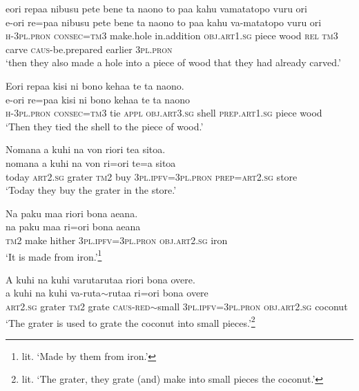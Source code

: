 \ea\label{ex:text01-78}
eori repaa nibusu pete bene ta naono to paa kahu vamatatopo vuru ori\\
\gll e-ori	re=paa	nibusu	pete	bene	ta	naono	to	paa	kahu	va-matatopo	vuru	ori\\
     \textsc{h}-3\textsc{pl}.\textsc{pron}	\textsc{consec}=\textsc{tm}3	make.hole	in.addition	\textsc{obj}.\textsc{art}1.\textsc{sg}	piece	wood	\textsc{rel}	\textsc{tm}3	carve	\textsc{caus}-be.prepared	earlier	3\textsc{pl}.\textsc{pron}\\
\glt `then they also made a hole into a piece of wood that they had already carved.'
\z

\ea\label{ex:text01-79}
Eori repaa kisi ni bono kehaa te ta naono.\\
\gll e-ori	re=paa	kisi	ni	bono	kehaa	te	ta	naono\\
     \textsc{h}-3\textsc{pl}.\textsc{pron}	\textsc{consec}=\textsc{tm}3	tie	\textsc{appl}	\textsc{obj}.\textsc{art}3.\textsc{sg}	shell	\textsc{prep}.\textsc{art}1.\textsc{sg}	piece	wood\\
\glt `Then they tied the shell to the piece of wood.'
\z

\ea\label{ex:text01-80}
Nomana a kuhi na von riori tea sitoa.\\
\gll nomana	a	kuhi	na	von	ri=ori	te=a	sitoa\\
     today	\textsc{art}2.\textsc{sg}	grater	\textsc{tm}2	buy	3\textsc{pl}.\textsc{ipfv}=3\textsc{pl}.\textsc{pron}	\textsc{prep}=\textsc{art}2.\textsc{sg}	store\\
\glt `Today they buy the grater in the store.'
\z

\ea\label{ex:text01-81}
Na paku maa riori bona aeana.\\
\gll na	paku	maa	ri=ori	bona	aeana\\
     \textsc{tm}2	make	hither	3\textsc{pl}.\textsc{ipfv}=3\textsc{pl}.\textsc{pron}	\textsc{obj}.\textsc{art}2.\textsc{sg}	iron\\
\glt `It is made from iron.'\footnote{lit. `Made by them from iron.'}
\z

\ea\label{ex:text01-82}
A kuhi na kuhi varutarutaa riori bona overe.\\
\gll a	kuhi	na	kuhi	va-ruta{$\sim$}rutaa	ri=ori	bona	overe\\
     \textsc{art}2.\textsc{sg}	grater	\textsc{tm}2	grate	\textsc{caus}-\textsc{red}{$\sim$}small	3\textsc{pl}.\textsc{ipfv}=3\textsc{pl}.\textsc{pron}	\textsc{obj}.\textsc{art}2.\textsc{sg}	coconut\\
\glt `The grater is used to grate the coconut into small pieces.'\footnote{lit. `The grater, they grate (and) make into small pieces the coconut.'}
\z


